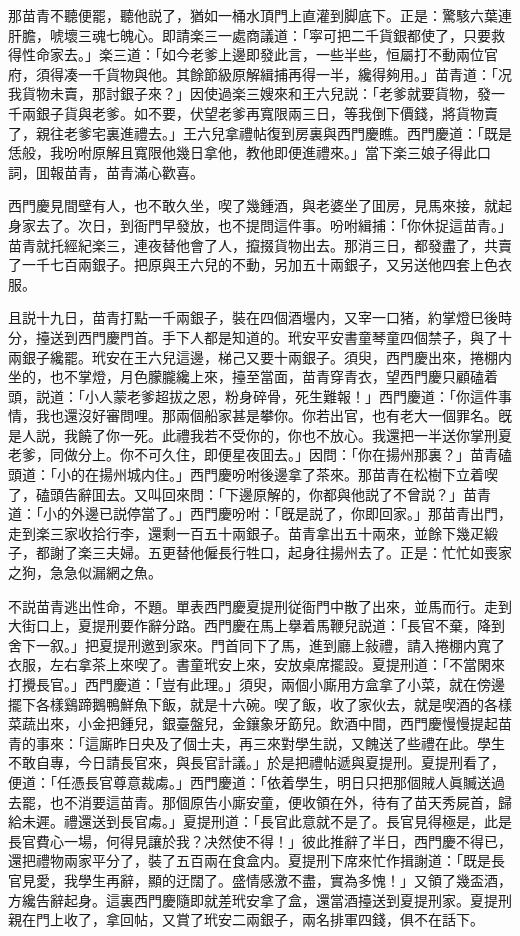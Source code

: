 那苗青不聽便罷，聽他説了，猶如一桶水頂門上直灌到脚底下。正是：驚駭六葉連肝膽，唬壞三魂七魄心。即請楽三一處商議道：「寜可把二千貨銀都使了，只要救得性命家去。」楽三道：「如今老爹上邊即發此言，一些半些，恒屬打不動兩位官府，須得凑一千貨物與他。其餘節級原解緝捕再得一半，纔得夠用。」苗青道：「况我貨物未賣，那討銀子來？」因使過楽三嫂來和王六兒説：「老爹就要貨物，發一千兩銀子貨與老爹。如不要，伏望老爹再寬限兩三日，等我倒下價錢，將貨物賣了，親往老爹宅裏進禮去。」王六兒拿禮帖復到房裏與西門慶瞧。西門慶道：「既是恁般，我吩咐原解且寬限他幾日拿他，教他即便進禮來。」當下楽三娘子得此口詞，囬報苗青，苗青滿心歡喜。

西門慶見間壁有人，也不敢久坐，喫了幾鍾酒，與老婆坐了囬房，見馬來接，就起身家去了。次日，到衙門早發放，也不提問這件事。吩咐緝捕：「你休捉這苗青。」苗青就托經紀楽三，連夜替他會了人，攛掇貨物出去。那消三日，都發盡了，共賣了一千七百兩銀子。把原與王六兒的不動，另加五十兩銀子，又另送他四套上色衣服。

且説十九日，苗青打點一千兩銀子，裝在四個酒壜内，又宰一口猪，約掌燈巳後時分，擡送到西門慶門首。手下人都是知道的。玳安平安書童琴童四個禁子，與了十兩銀子纔罷。玳安在王六兒這邊，梯己又要十兩銀子。須臾，西門慶出來，捲棚内坐的，也不掌燈，月色朦朧纔上來，擡至當面，苗青穿青衣，望西門慶只顧磕着頭，説道：「小人蒙老爹超拔之恩，粉身碎骨，死生難報！」西門慶道：「你這件事情，我也還沒好審問哩。那兩個船家甚是攀你。你若出官，也有老大一個罪名。旣是人説，我饒了你一死。此禮我若不受你的，你也不放心。我還把一半送你掌刑夏老爹，同做分上。你不可久住，即便星夜囬去。」因問：「你在揚州那裏？」苗青磕頭道：「小的在揚州城内住。」西門慶吩咐後邊拿了茶來。那苗青在松樹下立着喫了，磕頭告辭囬去。又叫回來問：「下邊原解的，你都與他説了不曾説？」苗青道：「小的外邊已説停當了。」西門慶吩咐：「旣是説了，你即回家。」那苗青出門，走到楽三家收拾行李，還剩一百五十兩銀子。苗青拿出五十兩來，並餘下幾疋緞子，都謝了楽三夫婦。五更替他僱長行牲口，起身往揚州去了。正是：忙忙如喪家之狗，急急似漏網之魚。

不説苗青逃出性命，不題。單表西門慶夏提刑従衙門中散了出來，並馬而行。走到大街口上，夏提刑要作辭分路。西門慶在馬上擧着馬鞭兒説道：「長官不棄，降到舍下一叙。」把夏提刑邀到家來。門首同下了馬，進到廳上敍禮，請入捲棚内寬了衣服，左右拿茶上來喫了。書童玳安上來，安放桌席擺設。夏提刑道：「不當閑來打攪長官。」西門慶道：「豈有此理。」須臾，兩個小廝用方盒拿了小菜，就在傍邊擺下各樣鷄蹄鵝鴨鮮魚下飯，就是十六碗。喫了飯，收了家伙去，就是喫酒的各樣菜蔬出來，小金把鍾兒，銀臺盤兒，金鑲象牙筯兒。飲酒中間，西門慶慢慢提起苗青的事來：「這廝昨日央及了個士夫，再三來對學生説，又餽送了些禮在此。學生不敢自專，今日請長官來，與長官計議。」於是把禮帖遞與夏提刑。夏提刑看了，便道：「任憑長官尊意裁䖏。」西門慶道：「依着學生，明日只把那個賊人眞贓送過去罷，也不消要這苗青。那個原告小廝安童，便收領在外，待有了苗天秀屍首，歸給未遲。禮還送到長官䖏。」夏提刑道：「長官此意就不是了。長官見得極是，此是長官費心一場，何得見讓於我？决然使不得！」彼此推辭了半日，西門慶不得已，還把禮物兩家平分了，裝了五百兩在食盒内。夏提刑下席來忙作揖謝道：「既是長官見愛，我學生再辭，顯的迂闊了。盛情感激不盡，實為多愧！」又領了幾盃酒，方纔告辭起身。這裏西門慶隨即就差玳安拿了盒，還當酒擡送到夏提刑家。夏提刑親在門上收了，拿回帖，又賞了玳安二兩銀子，兩名排軍四錢，俱不在話下。

